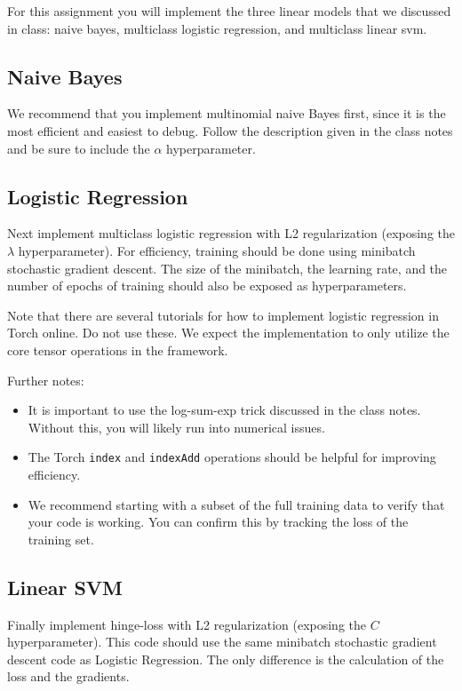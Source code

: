 \documentclass[11pt]{article}
\begin{document}
For this assignment you will implement the three linear models that 
we discussed in class: naive bayes, multiclass logistic regression, 
and multiclass linear svm.

\subsection{Naive Bayes}

We recommend that you implement multinomial naive Bayes first, since
it is the most efficient and easiest to debug. Follow the description
given in the class notes and be sure to include the $\alpha$
hyperparameter.

\subsection{Logistic Regression}

Next implement multiclass logistic regression with L2 regularization
(exposing the $\lambda$ hyperparameter). For efficiency, training
should be done using minibatch stochastic gradient descent. The size
of the minibatch, the learning rate, and the number of epochs of
training should also be exposed as hyperparameters.

Note that there are several tutorials for how to implement logistic
regression in Torch online. Do not use these. We expect the
implementation to only utilize the core tensor operations in the
framework.

Further notes:

\begin{itemize}
\item It is important to use the log-sum-exp trick discussed in the
  class notes. Without this, you will likely run into numerical
  issues.

\item The Torch \texttt{index} and \texttt{indexAdd} operations should 
  be helpful for improving efficiency.

\item We recommend starting with a subset of the full training data to
  verify that your code is working. You can confirm this by tracking
  the loss of the training set.
\end{itemize}

\subsection{Linear SVM}

Finally implement hinge-loss with L2 regularization (exposing the $C$
hyperparameter). This code should use the same minibatch stochastic
gradient descent code as Logistic Regression. The only difference is
the calculation of the loss and the gradients. 
\end{document}
